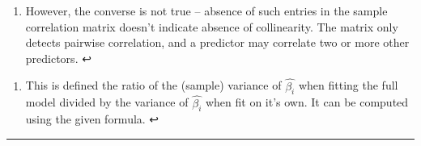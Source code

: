 \documentclass[11pt]{article}
\providecommand{\tightlist}{%
      \setlength{\itemsep}{0pt}\setlength{\parskip}{0pt}}
\begin{document}
\hypertarget{foot23}{}
\begin{enumerate}
\def\labelenumi{\arabic{enumi}.}
\setcounter{enumi}{22}
\tightlist
\item
  However, the converse is not true -- absence of such entries in the
  sample correlation matrix doesn't indicate absence of collinearity.
  The matrix only detects pairwise correlation, and a predictor may
  correlate two or more other predictors. ↩
\end{enumerate}

\hypertarget{foot24}{}
\begin{enumerate}
\def\labelenumi{\arabic{enumi}.}
\setcounter{enumi}{23}
\tightlist
\item
  This is defined the ratio of the (sample) variance of
  \(\hat{\beta_i}\) when fitting the full model divided by the variance
  of \(\hat{\beta_i}\) when fit on it's own. It can be computed using
  the given formula. ↩
\end{enumerate}

\begin{center}\rule{0.5\linewidth}{\linethickness}\end{center}


    
    
    
    
\end{document}
